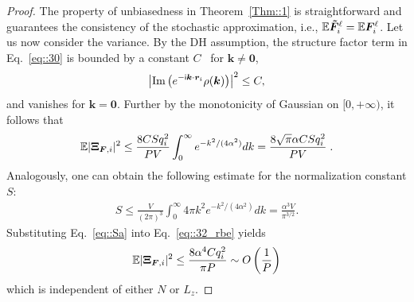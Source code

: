 \begin{proof}%
    The property of unbiasedness in Theorem~\ref{Thm::1} is straightforward and guarantees the consistency of the stochastic approximation, i.e., $\mathbb{E}\boldsymbol{ \tilde{F}}_i^{\ell}=\mathbb{E}\boldsymbol{F}_i^{\ell}$. 
    Let us now consider the variance.
    By the DH assumption, the structure factor term in Eq.~\eqref{eq::30} is bounded by a constant $C$~\cite{jin2021random} for $\bm{k}\neq \bm{0}$,
    \begin{equation}
        \left|\text{Im}\left(e^{-\mathsf i \boldsymbol{k}\cdot \boldsymbol{r}_i}\rho(\boldsymbol{k})\right)\right|^2\leq C,
    \end{equation}
    and vanishes for $\bm{k}=\bm{0}$. 
    Further by the monotonicity of Gaussian on $[0, +\infty )$, it follows that
    \begin{equation}\label{eq::32_rbe}
        \begin{split}
            \mathbb{E}|\V \Xi_{\V F,i}|^2\leq \frac{8 CSq_i^2}{PV}\int_{0}^{\infty}e^{-k^2/(4\alpha^2)}dk= \frac{8\sqrt{\pi}\alpha CSq_i^2}{PV}\;.%
        \end{split}
    \end{equation}
    Analogously, one can obtain the following estimate for the normalization constant $S$:
    \begin{equation}\label{eq::Sa}
        \begin{split}
            S\leq \frac{V}{(2\pi)^3}\int_{0}^{\infty}4\pi k^2e^{-k^2/(4\alpha^2)}dk=\frac{\alpha^3V}{\pi^{3/2}}.
        \end{split}
    \end{equation}
    Substituting Eq.~\eqref{eq::Sa} into Eq.~\eqref{eq::32_rbe} yields
    \begin{equation}
        \mathbb{E}|\boldsymbol{\Xi}_{\boldsymbol{F},i}|^2\leq\frac{8\alpha^4Cq_i^2}{\pi P}\sim O\left(\frac{1}{P}\right)
    \end{equation}
    which is independent of either $N$ or $L_z$.
\end{proof}

